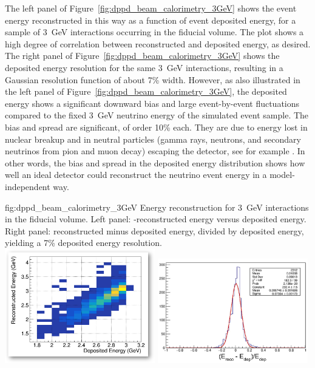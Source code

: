 The left panel of Figure~\ref{fig:dppd_beam_calorimetry_3GeV} shows the event energy reconstructed in this way  as a function of event deposited energy, for a sample of \SI{3}{\GeV} \nue {} interactions occurring in the  fiducial volume. The plot shows a high degree of correlation between reconstructed and deposited energy, as desired. The right panel of Figure~\ref{fig:dppd_beam_calorimetry_3GeV} shows the deposited energy resolution for the same \SI{3}{\GeV} interactions, resulting in a Gaussian resolution function of about \num{7}\% width. However, as also illustrated in the left panel of Figure~\ref{fig:dppd_beam_calorimetry_3GeV}, the deposited energy shows a significant downward bias and large event-by-event fluctuations compared to the fixed \SI{3}{GeV} neutrino energy of the simulated event sample. The bias and  spread are significant, of order \num{10}\% each. They are due to energy lost in nuclear breakup and in neutral particles (gamma rays, neutrons, and secondary neutrinos from pion and muon decay) escaping the detector, see for example \cite{Friedland:2018vry}. In other words, the bias and spread in the deposited energy distribution shows how well an ideal detector could reconstruct the neutrino event energy in a model-independent way.

\begin{dunefigure}{fig:dppd_beam_calorimetry_3GeV}
{Energy reconstruction for \SI{3}{GeV} \nue {} interactions in the \lar fiducial volume. Left panel: -reconstructed energy versus deposited energy. Right panel:  reconstructed minus deposited energy, divided by deposited energy, yielding a \num{7}\% deposited energy resolution.}
\includegraphics[width=0.49\textwidth]{graphics/dppd_ereco_vs_edep_nuecc_3gev.png} \hfill
\includegraphics[width=0.49\textwidth]{graphics/dppd_edep_resolution_nuecc_3gev.png}
\end{dunefigure}

